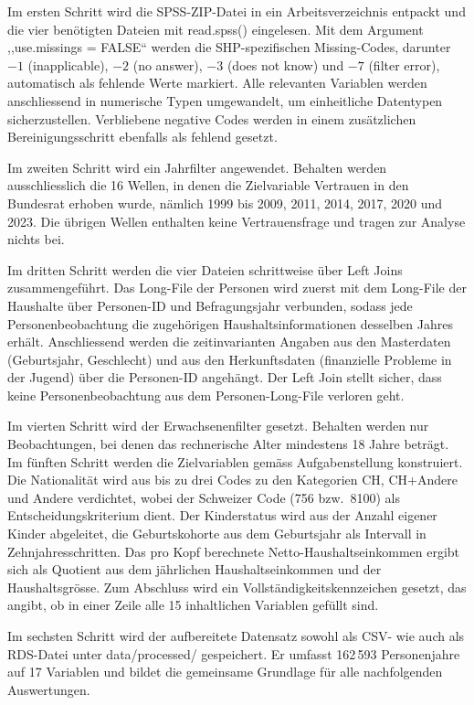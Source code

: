 Im ersten Schritt wird die SPSS-ZIP-Datei in ein Arbeitsverzeichnis entpackt und die
vier benötigten Dateien mit read.spss() eingelesen. Mit dem Argument
,,use.missings = FALSE`` werden die SHP-spezifischen Missing-Codes, darunter
\mbox{$-1$} (inapplicable), \mbox{$-2$} (no answer), \mbox{$-3$} (does not know) und
\mbox{$-7$} (filter error), automatisch als fehlende Werte markiert. Alle relevanten
Variablen werden anschliessend in numerische Typen umgewandelt, um einheitliche
Datentypen sicherzustellen. Verbliebene negative Codes werden in einem zusätzlichen
Bereinigungsschritt ebenfalls als fehlend gesetzt.

Im zweiten Schritt wird ein Jahrfilter angewendet. Behalten werden ausschliesslich die
16 Wellen, in denen die Zielvariable Vertrauen in den Bundesrat erhoben wurde, nämlich 1999 bis
2009, 2011, 2014, 2017, 2020 und 2023. Die übrigen Wellen enthalten keine
Vertrauensfrage und tragen zur Analyse nichts bei.

Im dritten Schritt werden die vier Dateien schrittweise über Left Joins
zusammengeführt. Das Long-File der Personen wird zuerst mit dem Long-File der
Haushalte über Personen-ID und Befragungsjahr verbunden, sodass jede
Personenbeobachtung die zugehörigen Haushaltsinformationen desselben Jahres erhält.
Anschliessend werden die zeitinvarianten Angaben aus den Masterdaten (Geburtsjahr,
Geschlecht) und aus den Herkunftsdaten (finanzielle Probleme in der Jugend) über die
Personen-ID angehängt. Der Left Join stellt sicher, dass keine
Personenbeobachtung aus dem Personen-Long-File verloren geht.

Im vierten Schritt wird der Erwachsenenfilter gesetzt. Behalten werden nur
Beobachtungen, bei denen das rechnerische Alter mindestens 18 Jahre beträgt. Im fünften
Schritt werden die Zielvariablen gemäss Aufgabenstellung konstruiert. Die Nationalität
wird aus bis zu drei Codes zu den Kategorien CH, CH+Andere und Andere verdichtet, wobei
der Schweizer Code (756 bzw.\ 8100) als Entscheidungskriterium dient. Der Kinderstatus
wird aus der Anzahl eigener Kinder abgeleitet, die Geburtskohorte aus dem Geburtsjahr
als Intervall in Zehnjahresschritten. Das pro Kopf berechnete Netto-Haushaltseinkommen
ergibt sich als Quotient aus dem jährlichen Haushaltseinkommen und der Haushaltsgrösse.
Zum Abschluss wird ein Vollständigkeitskennzeichen gesetzt, das angibt, ob in einer
Zeile alle 15 inhaltlichen Variablen gefüllt sind.

Im sechsten Schritt wird der aufbereitete Datensatz sowohl als CSV- wie auch als
RDS-Datei unter data/processed/ gespeichert. Er umfasst 162\,593
Personenjahre auf 17 Variablen und bildet die gemeinsame Grundlage für alle
nachfolgenden Auswertungen.


